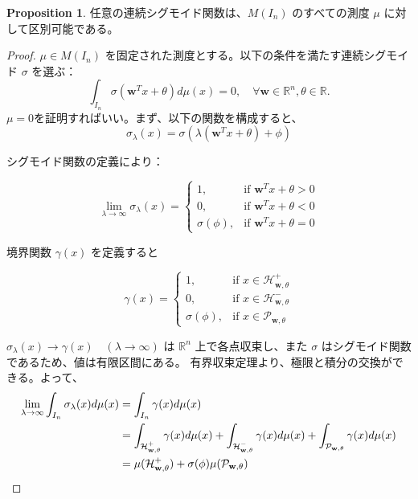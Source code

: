 \documentclass[a4paper]{jsarticle}
\theoremstyle{definition}
\newtheorem{prop}[dfn]{Proposition}
\begin{document}
\begin{prop}
任意の連続シグモイド関数は、$M(I_n)$ のすべての測度 $\mu$ に対して区別可能である。


\begin{proof}
$\mu \in M(I_n)$ を固定された測度とする。以下の条件を満たす連続シグモイド $\sigma$ を選ぶ：
\begin{equation}
  \int_{I_n} \sigma(\mathbf{w}^T x + \theta)d\mu(x) = 0, \quad \forall \mathbf{w} \in \mathbb{R}^n, \theta \in \mathbb{R}.\label{eq2}
\end{equation}
$\mu=0$を証明すればいい。まず、以下の関数を構成すると、
\[
\sigma_\lambda(x) = \sigma(\lambda(\mathbf{w}^T x + \theta) + \phi)
\]

シグモイド関数の定義により：

\[
\lim_{\lambda \to \infty} \sigma_\lambda(x) = \begin{cases} 
1, & \text{if } \mathbf{w}^T x + \theta > 0 \\
0, & \text{if } \mathbf{w}^T x + \theta < 0 \\
\sigma(\phi), & \text{if } \mathbf{w}^T x + \theta = 0
\end{cases}
\]

境界関数 $\gamma(x)$ を定義すると

\[
\gamma(x) = \begin{cases} 
1, & \text{if } x \in \mathcal{H}^+_{\mathbf{w},\theta} \\
0, & \text{if } x \in \mathcal{H}^-_{\mathbf{w},\theta} \\
\sigma(\phi), & \text{if } x \in \mathcal{P}_{\mathbf{w},\theta}
\end{cases}
\]

$\sigma_\lambda(x) \to \gamma(x)\quad (\lambda\to\infty)$ は $\mathbb{R}^n$ 上で各点収束し、また $\sigma$ はシグモイド関数であるため、値は有限区間にある。
有界収束定理より、極限と積分の交換ができる。よって、
\begin{align}
  \lim_{\lambda \to \infty} \int_{I_n} \sigma_\lambda(x) d\mu(x) &= \int_{I_n} \gamma(x) d\mu(x)\notag\\
  &= \int_{\mathcal{H}^+_{\mathbf{w},\theta}} \gamma(x) d\mu(x) + \int_{\mathcal{H}^-_{\mathbf{w},\theta}} \gamma(x) d\mu(x) + \int_{\mathcal{P}_{\mathbf{w},\theta}} \gamma(x) d\mu(x) \notag\\
  &= \mu(\mathcal{H}^+_{\mathbf{w},\theta}) + \sigma(\phi) \mu(\mathcal{P}_{\mathbf{w},\theta})\notag
\end{align}







\end{proof}
\end{prop}
\end{document}
